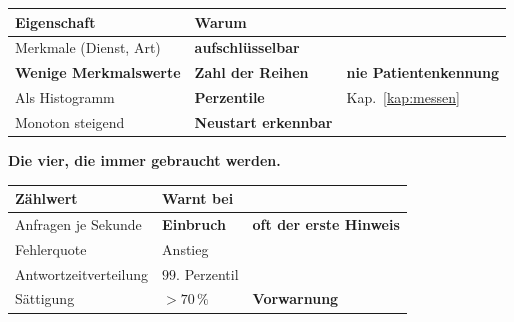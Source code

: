 \begin{merksatz}
\begin{center}
{\small
\renewcommand{\arraystretch}{1.5}
\begin{tabular}{@{}P{2.8cm}P{2.6cm}P{2.6cm}@{}}
\toprule
\textbf{Eigenschaft} & \textbf{Warum} & \\
\midrule
Merkmale (Dienst, Art) & \textbf{aufschlüsselbar} & \\
\textbf{Wenige Merkmalswerte} & \textcolor{akzent}{\textbf{Zahl der Reihen}} & \textcolor{akzent}{\textbf{nie Patientenkennung}}\\
Als Histogramm & \textbf{Perzentile} & \textcolor{gruen}{Kap.~\ref{kap:messen}}\\
Monoton steigend & \textbf{Neustart erkennbar} & \\
\bottomrule
\end{tabular}}
\end{center}

\begin{center}
\begin{minipage}{0.88\textwidth}
\end{minipage}
\end{center}

\textbf{Die vier, die immer gebraucht werden.}

\begin{center}
\renewcommand{\arraystretch}{1.5}
\begin{tabular}{@{}P{2.8cm}P{2.4cm}P{2.6cm}@{}}
\toprule
\textbf{Zählwert} & \textbf{Warnt bei} & \\
\midrule
Anfragen je Sekunde & \textbf{Einbruch} & \textcolor{gruen}{\textbf{oft der erste Hinweis}}\\
Fehlerquote & Anstieg & \\
Antwortzeit\-verteilung & $99.$ Perzentil & \\
Sättigung & \textbf{$>70\,\%$} & \textcolor{gruen}{\textbf{Vorwarnung}}\\
\bottomrule
\end{tabular}
\end{center}

\begin{center}
\end{center}


\end{merksatz}

